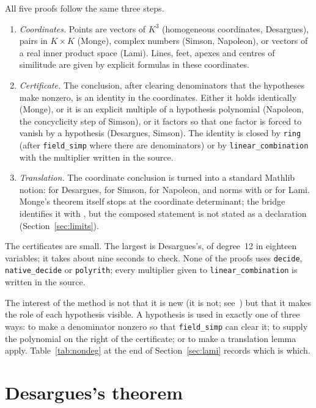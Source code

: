 \documentclass[11pt]{article}
\theoremstyle{definition}
\theoremstyle{remark}
\newcommand{\lean}[1]{\texttt{#1}}
\begin{document}
All five proofs follow the same three steps.
\begin{enumerate}
\item \emph{Coordinates.} Points are vectors of $K^3$ (homogeneous coordinates, Desargues),
pairs in $K\times K$ (Monge), complex numbers (Simson, Napoleon), or vectors of a real inner
product space (Lami). Lines, feet, apexes and centres of similitude are given by explicit
formulas in these coordinates.
\item \emph{Certificate.} The conclusion, after clearing denominators that the hypotheses make
nonzero, is an identity in the coordinates. Either it holds identically (Monge), or it is an
explicit multiple of a hypothesis polynomial (Napoleon, the concyclicity step of Simson), or it
factors so that one factor is forced to vanish by a hypothesis (Desargues, Simson). The identity
is closed by \lean{ring} (after \lean{field\_simp} where there are denominators) or by
\lean{linear\_combination} with the multiplier written in the source.
\item \emph{Translation.} The coordinate conclusion is turned into a standard Mathlib notion:
 for Desargues,  for Simson, 
for Napoleon, and norms with  or  for
Lami. Monge's theorem itself stops at the coordinate determinant; the bridge
 identifies it with , but the composed
statement is not stated as a declaration (Section~\ref{sec:limits}).
\end{enumerate}
The certificates are small. The largest is Desargues's, of degree~12 in eighteen variables; it
takes about nine seconds to check. None of the proofs uses \lean{decide}, \lean{native\_decide} or
\lean{polyrith}; every multiplier given to \lean{linear\_combination} is written in the source.

The interest of the method is not that it is new (it is not; see~\cite{Chou}) but that it makes
the role of each hypothesis visible. A hypothesis is used in exactly one of three ways: to make a
denominator nonzero so that \lean{field\_simp} can clear it; to supply the polynomial on the right
of the certificate; or to make a translation lemma apply. Table~\ref{tab:nondeg} at the end of
Section~\ref{sec:lami} records which is which.

\section{Desargues's theorem}\label{sec:desargues}
\end{document}
